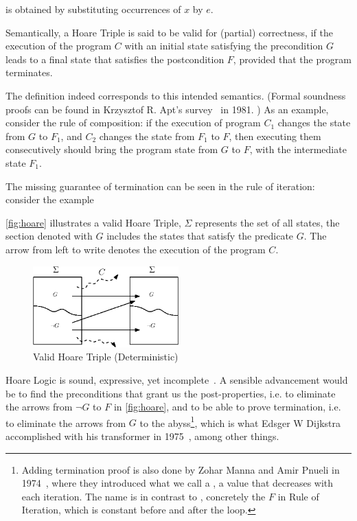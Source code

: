  is obtained by substituting occurrences of $x$ by $e$. 

Semantically, a Hoare Triple {{}} is said to be valid for (partial) correctness, if the execution of the program $C$ with an initial state satisfying the precondition $G$ leads to a final state that satisfies the postcondition $F$, provided that the program terminates. 

The definition indeed corresponds to this intended semantics. (Formal soundness proofs can be found in Krzysztof R. Apt's survey~\cite{apt81} in 1981. )
As an example, consider the rule of composition: if the execution of program $C_1$ changes the state from $G$ to $F_1$, and $C_2$ changes the state from $F_1$ to $F$, then executing them consecutively should bring the program state from $G$ to $F$, with the intermediate state $F_1$.

The missing guarantee of termination can be seen in the rule of iteration: consider the example 

\autoref{fig:hoare} illustrates a valid Hoare Triple, $\Sigma$ represents the set of all states, the section denoted with $G$ includes the states that satisfy the predicate $G$. The arrow from left to write denotes the execution of the program $C$. 


\begin{figure}[ht!]\centering
\includegraphics[width=0.5\textwidth]{image/hoare.eps}
\caption{Valid Hoare Triple (Deterministic)}
\label{fig:hoare}
\end{figure}


Hoare Logic is sound, expressive, yet incomplete~\cite{apt81}.
A sensible advancement would be to find the  preconditions that grant us the post-properties, i.e. to eliminate the arrows from $\neg G$ to $F$ in \autoref{fig:hoare}, and to be able to prove termination, i.e. to eliminate the arrows from $G$ to the abyss\footnote{Adding termination proof is also done by Zohar Manna and Amir Pnueli in 1974~\cite{manna74}, where they introduced what we call a , a value that decreases with each iteration. The name is in contrast to , concretely the $F$ in Rule of Iteration, which is constant before and after the loop. }, which is what Edsger W Dijkstra accomplished with his  transformer in 1975~\cite{dijkstra75}, among other things. 


